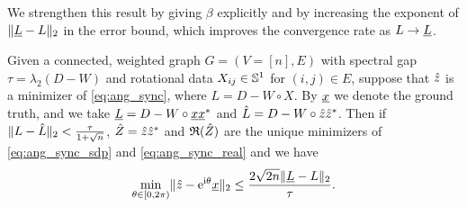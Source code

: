 We strengthen this result by giving $\beta$ explicitly and by increasing the exponent of $\lVert \underline{L} - L \rVert_2$ in the error bound, which improves the convergence rate as $L \to \underline{L}$.

\begin{theorem}
  Given a connected, weighted graph $G = (V = [n], E)$ with spectral gap $\tau = \lambda_2(D - W)$ and rotational data $X_{ij} \in \mathbb{S}^1$ for $(i, j) \in E$, suppose that $\hat{z}$ is a minimizer of \eqref{eq:ang_sync}, where $L = D - W \circ X$.  By $\underline{x}$ we denote the ground truth, and we take $\underline{L} = D - W \circ \underline{x} \underline{x}^*$ and $\hat{L} = D - W \circ \hat{z} \hat{z}^*$.  Then if $\lVert L - \hat{L} \rVert_2 < \frac{\tau}{1 + \sqrt{n}}$, $\hat{Z} = \hat{z} \hat{z}^*$ and $\mathfrak{R}(\hat{Z})$ are the unique minimizers of \eqref{eq:ang_sync_sdp} and \eqref{eq:ang_sync_real} and we have \begin{equation} \min_{\theta \in [0, 2\pi)} \lVert \hat{z} - \mathrm{e}^{\mathrm{i} \theta} \underline{x} \rVert_2 \le \dfrac{2 \sqrt{2 n} \lVert\underline{L} - L\rVert_2}{\tau}.\label{eq:ang_sync_bound}\end{equation}
  \label{thm:ang_sync_dual}
\end{theorem}

